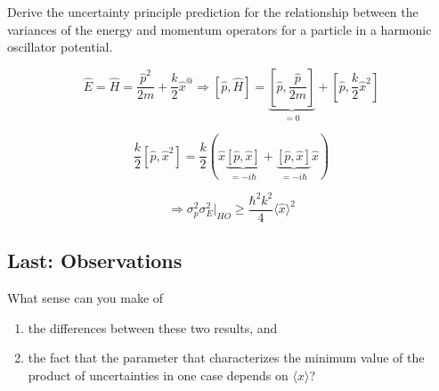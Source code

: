 \documentclass{article}
\begin{document}
Derive the uncertainty principle prediction for the relationship between the variances of the energy and momentum operators for a particle in a harmonic oscillator potential. 

$$\hat{E} = \hat{H} = \frac{\hat{p}^2}{2m} + \frac{k}{2} \hat{x}^@ \Rightarrow [\hat{p}, \hat{H}] = \underbrace{[\hat{p}, \frac{\hat{p}}{2m}]}_{=0} + [\hat{p}, \frac{k}{2} \hat{x}^2]$$

$$\frac{k}{2} [\hat{p}, \hat{x}^2] = \frac{k}{2} \left( \hat{x} \underbrace{[\hat{p}, \hat{x}]}_{=-i \hbar} + \underbrace{[\hat{p}, \hat{x}]}_{=-i \hbar} \hat{x} \right)$$

$$\Rightarrow \sigma_p^2 \sigma_E^2 |_{HO} \geq \frac{\hbar^2 k^2}{4} \langle \hat{x} \rangle^2$$


\subsection{Last: Observations}


What sense can you make of 

\begin{enumerate}
    \item the differences between these two results, and
    \item the fact that the parameter that characterizes the minimum value of the product of uncertainties in one case depends on $\langle x \rangle$?
\end{enumerate}
\end{document}
